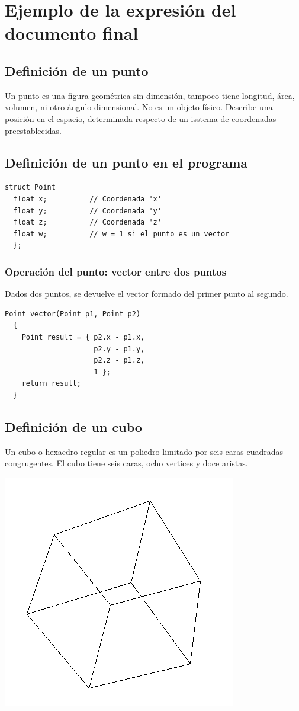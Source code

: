 \documentclass{article}
\begin{document}
\newpage
\section{Ejemplo de la expresión del documento final}
\subsection{Definición de un punto}
Un punto es una figura geométrica sin dimensión, tampoco tiene longitud, área, volumen, ni otro ángulo dimensional. No es un objeto físico. Describe una posición en el espacio, determinada respecto de un isstema de coordenadas preestablecidas.
\subsection{Definición de un punto en el programa}
\begin{lstlisting}[frame=single]
  struct Point 
  float x;          // Coordenada 'x'
  float y;          // Coordenada 'y'
  float z;          // Coordenada 'z'
  float w;          // w = 1 si el punto es un vector
  };
\end{lstlisting}
\subsubsection{Operación del punto: vector entre dos puntos}
Dados dos puntos, se devuelve el vector formado del primer punto al segundo.
\begin{lstlisting}[frame=single]
  Point vector(Point p1, Point p2)
  {
    Point result = { p2.x - p1.x,
                     p2.y - p1.y,
                     p2.z - p1.z,
                     1 };
    return result;
  }
\end{lstlisting}

\newpage


\subsection{Definición de un cubo}
Un cubo o hexaedro regular es un poliedro limitado por seis caras cuadradas congrugentes. El cubo tiene seis caras, ocho vertices y doce aristas.
\begin{center}
  \includegraphics[scale=0.25]{img/cube.png}
\end{center}
\end{document}
